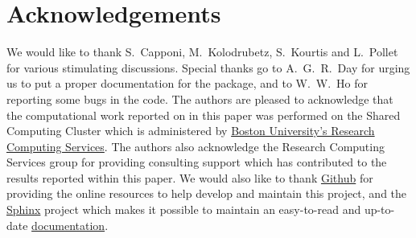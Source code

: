 \documentclass{SciPost}
\newcommand\0{\scalebox{-1}[1]{0}}
\begin{document}
\section*{Acknowledgements}
We would like to thank S.~Capponi, M.~Kolodrubetz, S.~Kourtis and L.~Pollet for various stimulating discussions. Special thanks go to A.~G.~R.~Day for urging us to put a proper documentation for the package, and to W.~W.~Ho for reporting some bugs in the code. The authors are pleased to acknowledge that the computational work reported on in this paper was performed on the Shared Computing Cluster which is administered by \href{http://www.bu.edu/tech/support/research/}{Boston University's Research Computing Services}. The authors also acknowledge the Research Computing Services group for providing consulting support which has contributed to the results reported within this paper. We would also like to thank \href{https://github.com/}{Github} for providing the online resources to help develop and maintain this project, and the \href{http://www.sphinx-doc.org/en/stable/#}{Sphinx} project which makes it possible to maintain an easy-to-read and up-to-date \href{http://weinbe58.github.io/QuSpin/index.html}{documentation}. 

\end{document}
